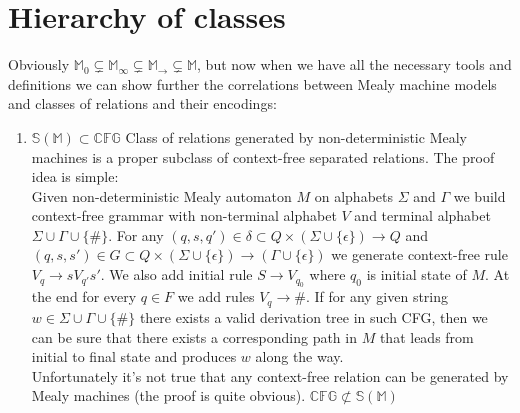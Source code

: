 \documentclass[12pt]{article}
\begin{document}
\section{Hierarchy of classes} Obviously $\mathbb{M}_0 \subsetneq \mathbb{M}_{\infty}  \subsetneq \mathbb{M}_{\rightarrow}  \subsetneq \mathbb{M} $, but now when we have all the necessary tools and definitions we  can show further the correlations between Mealy machine models and classes of relations and their encodings:
 \begin{enumerate}


\item $\mathbb{S}(\mathbb{M}) \subset \mathbb{CFG}$ Class of relations generated by non-deterministic Mealy machines is a proper subclass of context-free separated relations. The proof idea is simple: \\
Given non-deterministic Mealy automaton $M$ on alphabets $\Sigma$ and $\Gamma$ we build context-free grammar with non-terminal alphabet $V$ and terminal alphabet $\Sigma \cup \Gamma \cup \{\#\}$. For any $(q,s,q') \in \delta \subset Q \times (\Sigma \cup \{\epsilon\}) \rightarrow Q$ and $(q,s,s') \in G \subset Q \times (\Sigma \cup \{\epsilon\}) \rightarrow (\Gamma \cup \{\epsilon\})$ we generate context-free rule $V_q \rightarrow s V_{q'} s'$.  We also add initial rule $S \rightarrow V_{q_0}$ where $q_0$ is initial state of $M$. At the end for every $q \in F$ we add rules $V_q \rightarrow \#$. If for any given string $w \in \Sigma \cup \Gamma \cup \{\#\}$ there exists a valid derivation tree in such CFG, then we can be sure that there exists a corresponding path in $M$ that leads from initial to final state and produces $w$ along the way. \\
Unfortunately it's not true that any context-free relation can be generated by Mealy machines (the proof is quite obvious). $ \mathbb{CFG} \not\subset \mathbb{S}(\mathbb{M})$


\end{enumerate}
\end{document}
